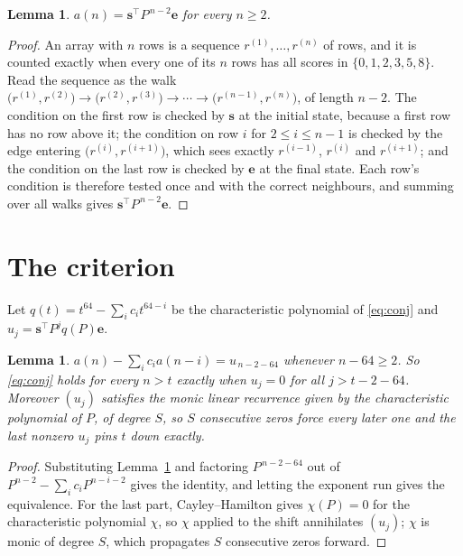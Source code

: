 \documentclass[11pt,a4paper]{article}
\theoremstyle{plain}
\newtheorem{lemma}[theorem]{Lemma}
\theoremstyle{definition}
\begin{document}
\begin{lemma}\label{lem:walk}
$a(n)=\mathbf{s}^{\!\top}P^{\,n-2}\mathbf{e}$ for every $n\ge2$.
\end{lemma}

\begin{proof}
An array with $n$ rows is a sequence $r^{(1)},\dots,r^{(n)}$ of rows, and it is counted
exactly when every one of its $n$ rows has all scores in $\{0,1,2,3,5,8\}$. Read the sequence as the
walk $\bigl(r^{(1)},r^{(2)}\bigr)\to\bigl(r^{(2)},r^{(3)}\bigr)\to\cdots\to
\bigl(r^{(n-1)},r^{(n)}\bigr)$, of length $n-2$. The condition on the first row is
checked by $\mathbf{s}$ at the initial state, because a first row has no row above it; the
condition on row $i$ for $2\le i\le n-1$ is checked by the edge entering
$\bigl(r^{(i)},r^{(i+1)}\bigr)$, which sees exactly $r^{(i-1)}$, $r^{(i)}$ and
$r^{(i+1)}$; and the condition on the last row is checked by $\mathbf{e}$ at the final
state. Each row's condition is therefore tested once and with the correct neighbours, and
summing over all walks gives $\mathbf{s}^{\!\top}P^{\,n-2}\mathbf{e}$.
\end{proof}

\section{The criterion}

Let $q(t)=t^{64}-\sum_i c_i t^{64-i}$ be the characteristic polynomial of
\eqref{eq:conj} and $u_j=\mathbf{s}^{\!\top}P^{j}q(P)\mathbf{e}$.

\begin{lemma}\label{lem:crit}
$a(n)-\sum_i c_i a(n-i)=u_{\,n-2-64}$ whenever $n-64\ge2$. So \eqref{eq:conj}
holds for every $n>t$ exactly when $u_j=0$ for all $j>t-2-64$. Moreover $(u_j)$
satisfies the monic linear recurrence given by the characteristic polynomial of $P$, of
degree $S$, so $S$ consecutive zeros force every later one and the last nonzero $u_j$ pins
$t$ down exactly.
\end{lemma}

\begin{proof}
Substituting Lemma~\ref{lem:walk} and factoring $P^{\,n-2-64}$ out of
$P^{n-2}-\sum_i c_i P^{n-i-2}$ gives the identity, and letting the exponent run gives the
equivalence. For the last part, Cayley--Hamilton gives $\chi(P)=0$ for the characteristic
polynomial $\chi$, so $\chi$ applied to the shift annihilates $(u_j)$; $\chi$ is monic of
degree $S$, which propagates $S$ consecutive zeros forward.
\end{proof}
\end{document}
